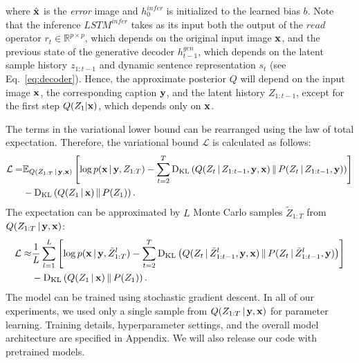 \documentclass{article} %
\newcommand{\Eqref}[1]{Eq.~\ref{#1}} %
\newcommand{\comm}[1]{}
\newcommand{\given}{\,|\,}
\newcommand{\expectation}{\mathbb{E}}
\newcommand{\kldiv}{\mathrm{D}_{\rm KL}}
\newcommand{\klBars}{\,\|\,}
\newcommand{\hdec}{h^{gen}}
\newcommand{\henc}{h^{infer}}
\newcommand{\readop}{\mathit{read}}
\newcommand{\encoder}{\mathit{LSTM}^{infer}}
\newcommand{\Lat}{Z}
\newcommand{\numSamples}{L}
\newcommand{\sampleIdx}{l}
\newcommand{\LatSample}{\tilde{Z}}
\newcommand{\icaption}{{\bf{y}}}
\newcommand{\oimage}{{\bf{x}}}
\newcommand{\post}{Q}
\newcommand{\prior}{P}
\newcommand{\loss}{\mathcal{L}}
\newcommand{\real}{\mathbb{R}}
\begin{document}
where $\hat{\oimage}$ is the \textit{error} image and $\henc_0$ is initialized to the learned bias $b$. 
Note that the inference $\encoder$ 
takes as its input both the output
of the $\readop$ operator $r_t\in \real^{p\times p}$, which depends on the original input image $\oimage$,
and the previous state of the 
generative decoder $\hdec_{t-1}$, which depends on the latent sample history $z_{1:t-1}$ and 
dynamic sentence representation $s_t$ (see \Eqref{eq:decoder}). 
Hence, the approximate posterior $Q$ will depend on the input image $\oimage$,
the corresponding caption $\icaption$, and the latent history $\Lat_{1:t-1}$, except  
for the first step $Q(Z_1 | \oimage)$, which depends only on $\oimage$.  

The terms in the variational lower bound can be rearranged using the law of total expectation. Therefore, the variational bound $\loss$ is calculated as follows:
\begin{align}
\label{eq:loss}
\loss =  &\expectation_{Q(\Lat_{1:T}\given\icaption,\oimage)}\left[ \log p(\oimage\given\icaption,\Lat_{1:T}) - \sum_{t=2}^T\kldiv\left(\post(\Lat_t\given\Lat_{1:t-1},\icaption,\oimage)\klBars\prior(\Lat_t\given\Lat_{1:t-1},\icaption)\right) \right] \nonumber \\& - \kldiv\left(\post(\Lat_1\given\oimage)\klBars\prior(\Lat_1)\right).
\end{align}
The expectation can be approximated by $\numSamples$ Monte Carlo samples $\LatSample_{1:T}$ from $\post(\Lat_{1:T}\given\icaption, \oimage)$:
\begin{align}
\label{eq:loss_mc}
\loss \approx  &\frac{1}{\numSamples}\sum_{\sampleIdx=1}^\numSamples\left[ \log p(\oimage\given\icaption,\LatSample^\sampleIdx_{1:T}) - \sum_{t=2}^T\kldiv\left(\post(\Lat_t\given\LatSample^\sampleIdx_{1:t-1},\icaption,\oimage)\klBars\prior(\Lat_t\given\LatSample^\sampleIdx_{1:t-1},\icaption)\right) \right] \nonumber \\& - \kldiv\left(\post(\Lat_1\given\oimage)\klBars\prior(\Lat_1)\right).
\end{align}
The model can be trained using stochastic gradient descent. 
In all of our experiments, we used only a single sample 
from $\post(\Lat_{1:T}\given\icaption, \oimage)$ for parameter learning.
Training details, hyperparameter settings,
and the overall model architecture are specified in Appendix. 
We will also release our code with pretrained models.

\comm{
\begin{align}
\loss &= -\sum_{t=1}^{T}D_{KL}(\post(\Lat_t|\henc_t,s_{t-1})\,||\,\prior(\Lat_t)) + \frac{1}{L}\sum_{l=1}^{L}log\,p(x_{t}|y,z)\\
&=
\frac{1}{2}\sum_{t=1}^{T}(1 - 2\,log\,\sigma_{t}^{prior} + 2\,log\,\sigma_{t} - \frac{\exp(2\,log\,\sigma_{t}) + (\mu_{t} - \mu_{t}^{prior})^{2}}{\exp(2\,log\,\sigma_{t}^{prior})}) + \frac{1}{L}\sum_{l=1}^{L}log\,p(x_{t}|y,z)
\end{align}
}
\end{document}
